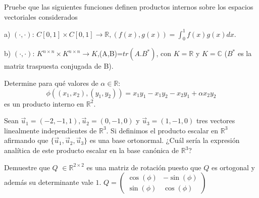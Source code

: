{\begin{exercise}
\item

Pruebe que las siguientes  funciones definen productos internos sobre los espacios vectoriales considerados


a)   $  (\cdot,\cdot)$: $ C\left[0,1\right] \times C\left[0,1\right]  \rightarrow  \mathbb{R}, (f(x),g(x))= \int_0^1f(x)g(x)dx$.

b)   $   (\cdot,\cdot)$:  $K^{n \times n}  \times K^{n \times n}\rightarrow K$,(A,B)=$tr(A.B^*)$, con $K=\mathbb{R}$ y $K=\mathbb{C}$ ($B^*$ es la matriz traspuesta conjugada de B). 
\end{exercise}

\begin{exercise} 
\item

Determine para qué valores de $\alpha \in \mathbb{R} $:
\[
\phi((x_1,x_2),(y_1,y_2))=x_1y_1-x_1y_2-x_2y_1+\alpha x_2y_2
\]
es un producto interno en $\mathbb{R}^2$.
\end{exercise}
\begin{exercise}
\item

Sean $\vec{u}_1=(-2,-1,1),\vec{u}_2=(0,-1,0)$ y $\vec{u}_3=(1,-1,0)$ tres vectores linealmente independientes de $\mathbb{R}^3$. Si definimos el producto
escalar en $\mathbb{R}^3$ afirmando que $\{\vec{u}_1,\vec{u}_2,\vec{u}_3\}$ es una base ortonormal. ¿Cuál sería la expresión analítica de este producto escalar
en la base canónica de $\mathbb{R}^3$?

\end{exercise}


\bigskip


\vspace{0.25cm}

\begin{exercise}
\item
Demuestre que $Q$  $\in \mathbb{R}^{2 \times  2  }$ es una matriz de rotación puesto que $Q$ es ortogonal y además su determinante vale $1$.
$Q=\left(\begin{array}{cc}\cos(\phi) & -\sin(\phi) \\ \sin(\phi)& \cos(\phi)
\end{array}
 \right)$
\end{exercise}
\begin{exercise}


\end{exercise}}
